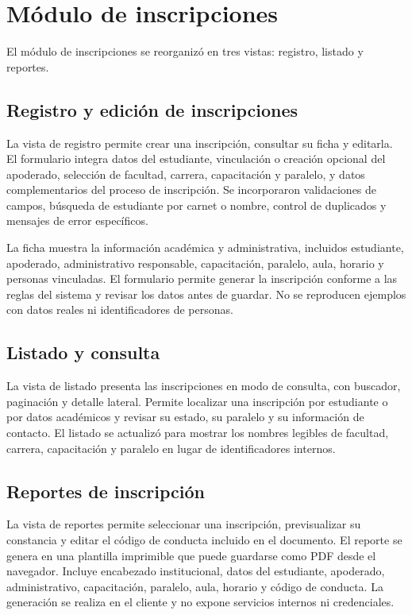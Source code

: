\documentclass[12pt,a4paper,oneside]{report}
\begin{document}
\section{Módulo de inscripciones}

El módulo de inscripciones se reorganizó en tres vistas: registro, listado y reportes.

\subsection{Registro y edición de inscripciones}

La vista de registro permite crear una inscripción, consultar su ficha y editarla. El formulario integra datos del estudiante, vinculación o creación opcional del apoderado, selección de facultad, carrera, capacitación y paralelo, y datos complementarios del proceso de inscripción. Se incorporaron validaciones de campos, búsqueda de estudiante por carnet o nombre, control de duplicados y mensajes de error específicos.

La ficha muestra la información académica y administrativa, incluidos estudiante, apoderado, administrativo responsable, capacitación, paralelo, aula, horario y personas vinculadas. El formulario permite generar la inscripción conforme a las reglas del sistema y revisar los datos antes de guardar. No se reproducen ejemplos con datos reales ni identificadores de personas.

\subsection{Listado y consulta}

La vista de listado presenta las inscripciones en modo de consulta, con buscador, paginación y detalle lateral. Permite localizar una inscripción por estudiante o por datos académicos y revisar su estado, su paralelo y su información de contacto. El listado se actualizó para mostrar los nombres legibles de facultad, carrera, capacitación y paralelo en lugar de identificadores internos.

\subsection{Reportes de inscripción}

La vista de reportes permite seleccionar una inscripción, previsualizar su constancia y editar el código de conducta incluido en el documento. El reporte se genera en una plantilla imprimible que puede guardarse como PDF desde el navegador. Incluye encabezado institucional, datos del estudiante, apoderado, administrativo, capacitación, paralelo, aula, horario y código de conducta. La generación se realiza en el cliente y no expone servicios internos ni credenciales.
\end{document}
